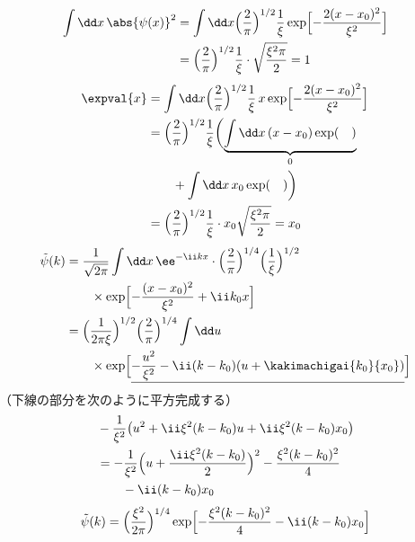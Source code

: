 \begin{align*}
\int\dd x\,\abs{\psi(x)}^{2}&=\int\dd x\Bigl(\frac{2}{\pi}\Bigr)^{1/2}\frac{1}{\xi}\exp\Bigl[-\frac{2(x-x_{0})^{2}}{\xi^{2}}\Bigr]\\
&=\Bigl(\frac{2}{\pi}\Bigr)^{1/2}\frac{1}{\xi}\cdot\sqrt{\frac{\xi^{2}\pi}{2}}=1
\end{align*}
\begin{align*}
\expval{x}&=\int\dd x\Bigl(\frac{2}{\pi}\Bigr)^{1/2}\frac{1}{\xi}\,x\exp\Bigl[-\frac{2(x-x_{0})^{2}}{\xi^{2}}\Bigr]\\
&=\Bigl(\frac{2}{\pi}\Bigr)^{1/2}\frac{1}{\xi}\biggl(\underbrace{\int\dd x\,(x-x_{0})\exp(\quad)}_{0}\\
&\qquad+\int\dd x\,x_{0}\exp(\quad)\biggr)\\
&=\Bigl(\frac{2}{\pi}\Bigr)^{1/2}\frac{1}{\xi}\cdot x_{0}\sqrt{\frac{\xi^{2}\pi}{2}}=x_{0}
\end{align*}
\begin{align*}
\tilde{\psi}(k)&=\frac{1}{\sqrt{2\pi}}\int\dd x\,\ee^{-\ii kx}\cdot\Bigl(\frac{2}{\pi}\Bigr)^{1/4}\Bigl(\frac{1}{\xi}\Bigr)^{1/2}\\
&\qquad\times\exp\Bigl[-\frac{(x-x_{0})^{2}}{\xi^{2}}+\ii k_{0}x\Bigr]\\
&=\Bigl(\frac{1}{2\pi\xi}\Bigr)^{1/2}\Bigl(\frac{2}{\pi}\Bigr)^{1/4}\int\dd u\\
&\qquad\times\exp\Bigl[\underline{-\frac{u^{2}}{\xi^{2}}-\ii(k-k_{0})(u+\kakimachigai{k_{0}}{x_{0}})}\Bigr]
\end{align*}
（下線の部分を次のように平方完成する）
\begin{align*}
&-\frac{1}{\xi^{2}}\bigl(u^{2}+\ii\xi^{2}(k-k_{0})u+\ii\xi^{2}(k-k_{0})x_{0}\bigr)\\
&=-\frac{1}{\xi^{2}}\Bigl(u+\frac{\ii\xi^{2}(k-k_{0})}{2}\Bigr)^{2}-\frac{\xi^{2}(k-k_{0})^{2}}{4}\\
&\qquad-\ii(k-k_{0})x_{0}
\end{align*}
\[ \tilde{\psi}(k)=\Bigl(\frac{\xi^{2}}{2\pi}\Bigr)^{1/4}\exp\Bigl[-\frac{\xi^{2}(k-k_{0})^{2}}{4}-\ii(k-k_{0})x_{0}\Bigr] \]

